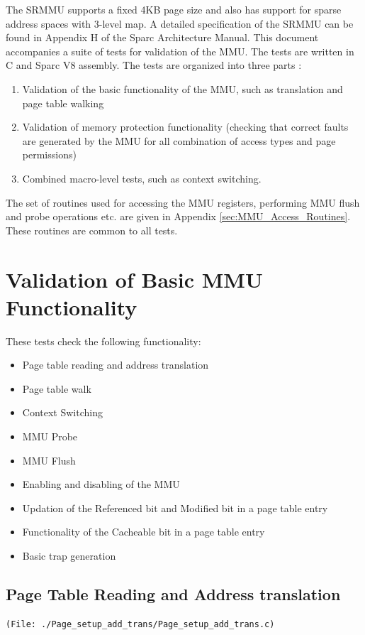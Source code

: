 \documentclass[12pt,a4paper]{article}
\begin{document}
The SRMMU supports a fixed 4KB page size and also has support for sparse
address spaces with 3-level map.  A detailed specification of the SRMMU can be
found in Appendix H of the Sparc Architecture Manual.  This document
accompanies a suite of tests for validation of the MMU. The tests are written
in C and Sparc V8 assembly. The tests are organized into three parts :
	\begin{enumerate}
	\item Validation of the basic functionality of the MMU, 
	such as translation and page table walking
	\item Validation of memory protection functionality 
	(checking that correct faults are generated by the MMU
	for all combination of access types and page permissions)
	\item Combined macro-level tests, such as context switching.
	\end{enumerate}
The set of routines used for accessing the MMU registers, performing MMU flush
and probe operations etc.  are given in Appendix \ref{sec:MMU_Access_Routines}.
These routines are common to all tests.




\section{Validation of Basic MMU Functionality}
These tests check the following functionality:
\begin{itemize}
\item Page table reading and address translation
\item Page table walk
\item Context Switching
\item MMU Probe 
\item MMU Flush
\item Enabling and disabling of the MMU
\item Updation of the Referenced bit and Modified bit in a page table entry
\item Functionality of the Cacheable bit in a page table entry
\item Basic trap generation
\end{itemize}  



\subsection{Page Table Reading and Address translation} 
\begin{lstlisting}
(File: ./Page_setup_add_trans/Page_setup_add_trans.c)
\end{lstlisting}
\end{document}
